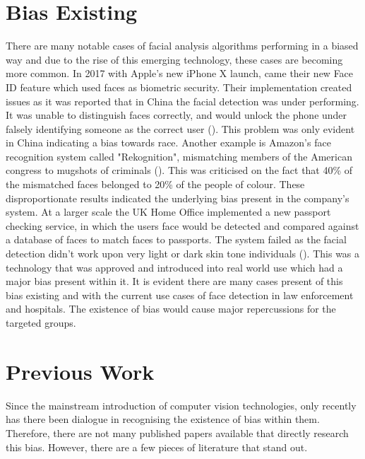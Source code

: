 \documentclass{l4proj}
\begin{document}
\section{Bias Existing}
\label{bias}
There are many notable cases of facial analysis algorithms performing in a biased way and due to the rise of this emerging technology, these cases are becoming more common. In 2017 with Apple's new iPhone X launch, came their new Face ID feature which used faces as biometric security. Their implementation created issues as it was reported that in China the facial detection was under performing. It was unable to distinguish faces correctly, and would unlock the phone under falsely identifying someone as the correct user (\cite{iphone}). This problem was only evident in China indicating a bias towards race. Another example is Amazon's face recognition system called "Rekognition", mismatching members of the American congress to mugshots of criminals (\cite{amazon}). This was criticised on the fact that 40\% of the mismatched faces belonged to 20\% of the people of colour. These disproportionate results indicated the underlying bias present in the company's system. At a larger scale the UK Home Office implemented a new passport checking service, in which the users face would be detected and compared against a database of faces to match faces to passports. The system failed as the facial detection didn't work upon very light or dark skin tone individuals (\cite{passport}). This was a technology that was approved and introduced into real world use which had a major bias present within it. It is evident there are many cases present of this bias existing and with the current use cases of face detection in law enforcement and hospitals. The existence of bias would cause major repercussions for the targeted groups.
\section{Previous Work}
Since the mainstream introduction of computer vision technologies, only recently has there been dialogue in recognising the existence of bias within them. Therefore, there are not many published papers available that directly research this bias. However, there are a few pieces of literature that stand out.
\end{document}
